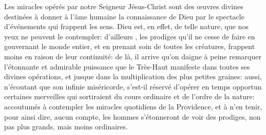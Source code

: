 Les miracles opérés par notre Seigneur Jésus-Christ sont des œuvres divines
	destinées à donner à l’âme humaine la connaissance de Dieu
	par le spectacle d’événements qui frappent les sens.
Dieu est, en effet, de telle nature, que nos yeux ne peuvent le contempler:
	d’ailleurs , les prodiges qu’il ne cesse de faire en gouvernant le monde entier,
	et en prenant soin de toutes les créatures,
	frappent moins en raison de leur continuité:
	de là, il arrive qu’on daigne à peine remarquer
		l’étonnante et admirable puissance
	que le Très-Haut manifeste dans toutes ses divines opérations,
	et jusque dans la multiplication des plus petites graines:
	aussi, n’écoutant que son infinie miséricorde,
	s’est-il réservé d’opérer en temps opportun
	certaines merveilles qui sortiraient du cours ordinaire et de l’ordre de la nature: accoutumés à contempler les miracles quotidiens de la Providence,
	et à n’en tenir, pour ainsi dire, aucun compte,
	les hommes s’étonneront de voir des prodiges,
		non pas plus grands, mais moins ordinaires.
